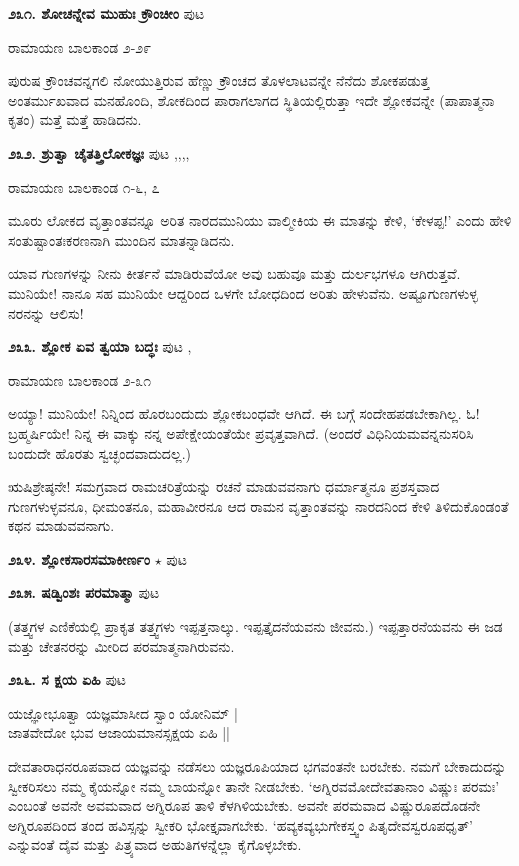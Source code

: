 \medskip
\noindent\textbf{೨೩೧. ಶೋಚನ್ನೇವ ಮುಹುಃ ಕ್ರೌಂಚೀಂ} \hfill ಪುಟ \pageref{203c}

\hfill ರಾಮಾಯಣ ಬಾಲಕಾಂಡ ೨-೨೯

ಪುರುಷ ಕ್ರೌಂಚವನ್ನಗಲಿ ನೋಯುತ್ತಿರುವ ಹೆಣ್ಣು ಕ್ರೌಂಚದ ತೊಳಲಾಟವನ್ನೇ ನೆನೆದು ಶೋಕಪಡುತ್ತ ಅಂತರ್ಮುಖವಾದ ಮನಹೊಂದಿ, ಶೋಕದಿಂದ ಪಾರಾಗಲಾಗದ ಸ್ಥಿತಿಯಲ್ಲಿರುತ್ತಾ ಇದೇ ಶ್ಲೋಕವನ್ನೇ (ಪಾಪಾತ್ಮನಾ ಕೃತಂ) ಮತ್ತೆ ಮತ್ತೆ ಹಾಡಿದನು.

\medskip
\noindent\textbf{೨೩೨. ಶ್ರುತ್ವಾ ಚೈತತ್ತ್ರಿಲೋಕಜ್ಞಃ} \hfill ಪುಟ \pageref{153c},\pageref{163d},\pageref{194c},\pageref{246b},\pageref{251b}

\hfill ರಾಮಾಯಣ ಬಾಲಕಾಂಡ ೧-೬, ೭

ಮೂರು ಲೋಕದ ವೃತ್ತಾಂತವನ್ನೂ ಅರಿತ ನಾರದಮುನಿಯು ವಾಲ್ಮೀಕಿಯ ಈ ಮಾತನ್ನು ಕೇಳಿ, `ಕೇಳಪ್ಪ!' ಎಂದು ಹೇಳಿ ಸಂತುಷ್ಟಾಂತಃಕರಣನಾಗಿ ಮುಂದಿನ ಮಾತನ್ನಾಡಿದನು.

ಯಾವ ಗುಣಗಳನ್ನು ನೀನು ಕೀರ್ತನೆ ಮಾಡಿರುವೆಯೋ ಅವು ಬಹುವೂ ಮತ್ತು ದುರ್ಲಭಗಳೂ ಆಗಿರುತ್ತವೆ. ಮುನಿಯೇ! ನಾನೂ ಸಹ ಮುನಿಯೇ ಆದ್ದರಿಂದ ಒಳಗೇ ಬೋಧದಿಂದ ಅರಿತು ಹೇಳುವೆನು. ಅಷ್ಟೂಗುಣಗಳುಳ್ಳ ನರನನ್ನು ಆಲಿಸು!

\medskip
\noindent\textbf{೨೩೩. ಶ್ಲೋಕ ಏವ ತ್ವಯಾ ಬದ್ಧಃ} \hfill ಪುಟ \pageref{157c},\pageref{181c}

\hfill ರಾಮಾಯಣ ಬಾಲಕಾಂಡ ೨-೩೧

ಅಯ್ಯಾ! ಮುನಿಯೇ! ನಿನ್ನಿಂದ ಹೊರಬಂದುದು ಶ್ಲೋಕಬಂಧವೇ ಆಗಿದೆ. ಈ ಬಗ್ಗೆ ಸಂದೇಹಪಡಬೇಕಾಗಿಲ್ಲ. ಓ! ಬ್ರಹ್ಮರ್ಷಿಯೇ! ನಿನ್ನ ಈ ವಾಕ್ಕು  ನನ್ನ ಅಪೇಕ್ಷೇಯಂತೆಯೇ ಪ್ರವೃತ್ತವಾಗಿದೆ. (ಅಂದರೆ ವಿಧಿನಿಯಮವನ್ನನುಸರಿಸಿ ಬಂದುದೇ ಹೊರತು ಸ್ವಚ್ಛಂದವಾದುದಲ್ಲ.)

ಋಷಿಶ್ರೇಷ್ಠನೇ! ಸಮಗ್ರವಾದ ರಾಮಚರಿತ್ರೆಯನ್ನು ರಚನೆ ಮಾಡುವವನಾಗು ಧರ್ಮಾತ್ಮನೂ ಪ್ರಶಸ್ತವಾದ ಗುಣಗಳುಳ್ಳವನೂ, ಧೀಮಂತನೂ, ಮಹಾವೀರನೂ ಆದ ರಾಮನ ವೃತ್ತಾಂತವನ್ನು ನಾರದನಿಂದ ಕೇಳಿ ತಿಳಿದುಕೊಂಡಂತೆ ಕಥನ ಮಾಡುವವನಾಗು. 

\medskip
\noindent\textbf{೨೩೪. ಶ್ಲೋಕಸಾರಸಮಾಕೀರ್ಣಂ} $\star$ \hfill ಪುಟ \pageref{152b}

\medskip
\noindent\textbf{೨೩೫. ಷಡ್ವಿಂಶಃ ಪರಮಾತ್ಮಾ} \hfill ಪುಟ \pageref{185}

(ತತ್ತ್ವಗಳ ಎಣಿಕೆಯಲ್ಲಿ ಪ್ರಾಕೃತ ತತ್ತ್ವಗಳು ಇಪ್ಪತ್ತನಾಲ್ಕು. ಇಪ್ಪತ್ತೈದನೆಯವನು ಜೀವನು.) ಇಪ್ಪತ್ತಾರನೆಯವನು ಈ ಜಡ ಮತ್ತು ಚೇತನರನ್ನು ಮೀರಿದ ಪರಮಾತ್ಮನಾಗಿರುವನು. 

\medskip
\noindent\textbf{೨೩೬. ಸ ಕ್ಷಯ ಏಹಿ} \hfill ಪುಟ \pageref{162a}

\begin{shloka}
ಯಜ್ಞೋಭೂತ್ವಾ ಯಜ್ಞಮಾಸೀದ ಸ್ವಾಂ ಯೋನಿಮ್ |\\
ಜಾತವೇದೋ ಭುವ ಆಜಾಯಮಾನಸ್ಸಕ್ಷಯ ಏಹಿ ||
\end{shloka} 

ದೇವತಾರಾಧನರೂಪವಾದ ಯಜ್ಞವನ್ನು ನಡೆಸಲು ಯಜ್ಞರೂಪಿಯಾದ ಭಗವಂತನೇ ಬರಬೇಕು. ನಮಗೆ ಬೇಕಾದುದನ್ನು ಸ್ವೀಕರಿಸಲು ನಮ್ಮ ಕೈಯನ್ನೋ ನಮ್ಮ ಬಾಯನ್ನೋ ತಾನೇ ನೀಡಬೇಕು. `ಅಗ್ನಿರವಮೋದೇವತಾನಾಂ ವಿಷ್ಣುಃ ಪರಮಃ' ಎಂಬಂತೆ ಅವನೇ ಅವಮವಾದ ಅಗ್ನಿರೂಪ ತಾಳಿ ಕೆಳಗಿಳಿಯಬೇಕು. ಅವನೇ ಪರಮವಾದ ವಿಷ್ಣುರೂಪದೊಡನೇ ಅಗ್ನಿರೂಪದಿಂದ ತಂದ ಹವಿಸ್ಸನ್ನು ಸ್ವೀಕರಿ ಭೋಕ್ತೃವಾಗಬೇಕು. `ಹವ್ಯಕವ್ಯಭುಗೇಕಸ್ತ್ವಂ ಪಿತೃದೇವಸ್ವರೂಪಧೃತ್' ಎನ್ನುವಂತೆ ದೈವ ಮತ್ತು ಪಿತ್ರ್ಯವಾದ ಅಹುತಿಗಳನ್ನೆಲ್ಲಾ ಕೈಗೊಳ್ಳಬೇಕು.

